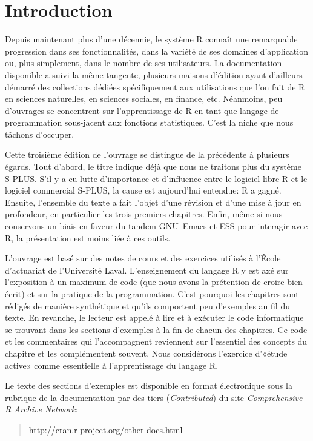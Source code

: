 \chapter*{Introduction}


Depuis maintenant plus d'une décennie, le système R connaît une
remarquable progression dans ses fonctionnalités, dans la variété de
ses domaines d'application ou, plus simplement, dans le nombre de ses
utilisateurs. La documentation disponible a suivi la même tangente,
plusieurs maisons d'édition ayant d'ailleurs démarré des collections
dédiées spécifiquement aux utilisations que l'on fait de R en sciences
naturelles, en sciences sociales, en finance, etc. Néanmoins, peu
d'ouvrages se concentrent sur l'apprentissage de R en tant que langage
de programmation sous-jacent aux fonctions statistiques. C'est la
niche que nous tâchons d'occuper.

Cette troisième édition de l'ouvrage se distingue de la précédente à
plusieurs égards. Tout d'abord, le titre indique déjà que nous ne
traitons plus du système S-PLUS. S'il y a eu lutte d'importance et
d'influence entre le logiciel libre R et le logiciel commercial
S-PLUS, la cause est aujourd'hui entendue: R a gagné. Ensuite,
l'ensemble du texte a fait l'objet d'une révision et d'une mise à jour
en profondeur, en particulier les trois premiers chapitres. Enfin,
même si nous conservons un biais en faveur du tandem GNU~Emacs et ESS
pour interagir avec R, la présentation est moins liée à ces outils.

L'ouvrage est basé sur des notes de cours et des exercices utilisés à
l'École d'actuariat de l'Université Laval. L'enseignement du langage R
y est axé sur l'exposition à un maximum de code (que nous avons la
prétention de croire bien écrit) et sur la pratique de la
programmation. C'est pourquoi les chapitres sont rédigés de manière
synthétique et qu'ils comportent peu d'exemples au fil du texte. En
revanche, le lecteur est appelé à lire et à exécuter le code
informatique se trouvant dans les sections d'exemples à la fin de
chacun des chapitres. Ce code et les commentaires qui l'accompagnent
reviennent sur l'essentiel des concepts du chapitre et les
complémentent souvent. Nous considérons l'exercice d'«étude active»
comme essentielle à l'apprentissage du langage R.

Le texte des sections d'exemples est disponible en format électronique
sous la rubrique de la documentation par des tiers
(\emph{Contributed}) du site \emph{Comprehensive R Archive Network}:
\begin{quote}
  \url{http://cran.r-project.org/other-docs.html}
\end{quote}

